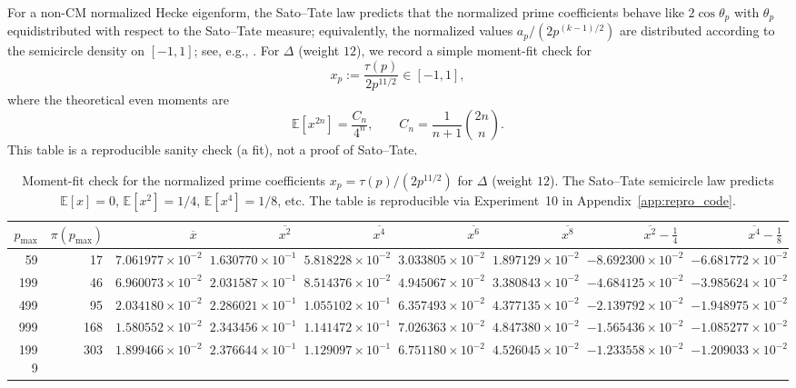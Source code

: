 For a non-CM normalized Hecke eigenform, the Sato--Tate law predicts that the normalized prime coefficients behave like $2\cos\theta_p$ with $\theta_p$ equidistributed with respect to the Sato--Tate measure; equivalently, the normalized values $a_p/(2p^{(k-1)/2})$ are distributed according to the semicircle density on $[-1,1]$; see, e.g., \cite{Clozel2006SatoTate,Harris2014SatoTate,BarnetLambGeeGeraghty2011}.
For $\Delta$ (weight $12$), we record a simple moment-fit check for
\begin{equation}
x_p:=\frac{\tau(p)}{2p^{11/2}}\in[-1,1],
\end{equation}
where the theoretical even moments are
\begin{equation}
\mathbb{E}[x^{2n}]=\frac{C_n}{4^n},\qquad C_n=\frac{1}{n+1}\binom{2n}{n}.
\end{equation}
This table is a reproducible sanity check (a fit), not a proof of Sato--Tate.

\begin{table}[H]
\centering
\begin{tabular}{rrrrrrrrr}
\toprule
$p_{\max}$ & $\pi(p_{\max})$ & $\overline{x}$ & $\overline{x^2}$ & $\overline{x^4}$ & $\overline{x^6}$ & $\overline{x^8}$ & $\overline{x^2}-\frac14$ & $\overline{x^4}-\frac18$ \\
\midrule
59   & 17  & $7.061977\times 10^{-2}$ & $1.630770\times 10^{-1}$ & $5.818228\times 10^{-2}$ & $3.033805\times 10^{-2}$ & $1.897129\times 10^{-2}$ & $-8.692300\times 10^{-2}$ & $-6.681772\times 10^{-2}$ \\
199  & 46  & $6.960073\times 10^{-2}$ & $2.031587\times 10^{-1}$ & $8.514376\times 10^{-2}$ & $4.945067\times 10^{-2}$ & $3.380843\times 10^{-2}$ & $-4.684125\times 10^{-2}$ & $-3.985624\times 10^{-2}$ \\
499  & 95  & $2.034180\times 10^{-2}$ & $2.286021\times 10^{-1}$ & $1.055102\times 10^{-1}$ & $6.357493\times 10^{-2}$ & $4.377135\times 10^{-2}$ & $-2.139792\times 10^{-2}$ & $-1.948975\times 10^{-2}$ \\
999  & 168 & $1.580552\times 10^{-2}$ & $2.343456\times 10^{-1}$ & $1.141472\times 10^{-1}$ & $7.026363\times 10^{-2}$ & $4.847380\times 10^{-2}$ & $-1.565436\times 10^{-2}$ & $-1.085277\times 10^{-2}$ \\
1999 & 303 & $1.899466\times 10^{-2}$ & $2.376644\times 10^{-1}$ & $1.129097\times 10^{-1}$ & $6.751180\times 10^{-2}$ & $4.526045\times 10^{-2}$ & $-1.233558\times 10^{-2}$ & $-1.209033\times 10^{-2}$ \\
\bottomrule
\end{tabular}
\caption{Moment-fit check for the normalized prime coefficients $x_p=\tau(p)/(2p^{11/2})$ for $\Delta$ (weight $12$). The Sato--Tate semicircle law predicts $\mathbb{E}[x]=0$, $\mathbb{E}[x^2]=1/4$, $\mathbb{E}[x^4]=1/8$, etc. The table is reproducible via Experiment~10 in Appendix~\ref{app:repro_code}.}
\label{tab:tau_sato_tate_moments}
\end{table}

